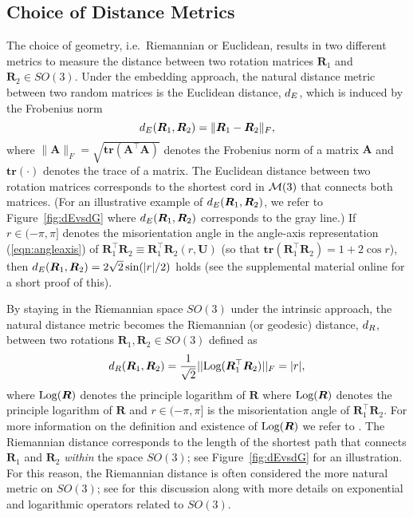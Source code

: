 \subsection{Choice of Distance Metrics}\label{subsec:metrics}

The choice of geometry, i.e.~Riemannian or Euclidean, results in two different metrics to measure the distance
between two rotation matrices $\bm{R}_1$ and $\bm{R}_2 \in SO(3)$. Under the embedding approach, the natural distance
metric between two random matrices is the Euclidean distance, ${d_E} $, which is induced by the Frobenius norm
\begin{equation}
\label{d_E}
{d_E} (\bm{R}_1,\bm{R}_2)=\|\bm{R}_1-\bm{R}_2\|_F, 
\end{equation}
where $\|\bm{A}\|_F = \sqrt{\mathbf{tr}({\bm A^\top \bm A})}$ denotes the Frobenius norm of a matrix $\bm A$ and $\mathbf{tr}(\cdot)$ denotes the trace of a matrix.  The Euclidean distance between two rotation matrices corresponds to the shortest cord in $\mathcal{M}(3)$  that connects both matrices. (For an illustrative example of ${d_E} (\bm{R}_1,\bm{R}_2)$, we refer to Figure~\ref{fig:dEvsdG} where ${d_E} (\bm{R}_1,\bm{R}_2)$ corresponds to the gray line.)  If $r\in(-\pi,\pi]$ denotes the misorientation angle in the angle-axis representation (\ref{eqn:angleaxis}) of $\bm{R}_1^\top \bm{R}_2 \equiv \bm{R}_1^\top \bm{R}_2(r,\bm{U})$ (so that $\mathbf{tr}(\bm{R}_1^\top \bm{R}_2) =1 +2 \cos r$), then ${d_E} (\bm{R}_1,\bm{R}_2) = 2\sqrt{2}\sin(|r|/2)$ holds (see the supplemental material online for a short proof of this).

\noindent By staying in the Riemannian space $SO(3)$ under the intrinsic approach, the natural distance metric becomes the Riemannian (or geodesic) distance, ${d_R} $, between two rotations $\bm{R}_1,\bm{R}_2\in SO(3)$ defined as
\begin{equation}
\label{d_R}
{d_R} (\bm{R}_1,\bm{R}_2)=  \frac{1}{\sqrt{2}}||
\text{Log}(\bm{R}_1^\top\bm{R}_2)||_F = |r|,
\end{equation}
where $\text{Log}(\bm{R})$ denotes the principle logarithm of $\bm{R}$ where $\text{Log}(\bm{R})$ denotes the principle logarithm of 
$\bm{R}$  and $r\in(-\pi,\pi]$   is the misorientation angle of $\bm{R}_1^\top \bm{R}_2$. For more information on the definition and existence 
of $\text{Log}(\bm{R})$ we refer to \cite{moakher02}.
The Riemannian distance corresponds to the length of the shortest path that connects $\bm{R}_1$ and $\bm{R}_2$ {\it within} the space $SO(3)$; see Figure~\ref{fig:dEvsdG} for an illustration. For this reason, the Riemannian distance is often considered the more natural metric on $SO(3)$; see \cite{moakher02} for this discussion along with more details on exponential and logarithmic operators related to $SO(3)$.    
 
